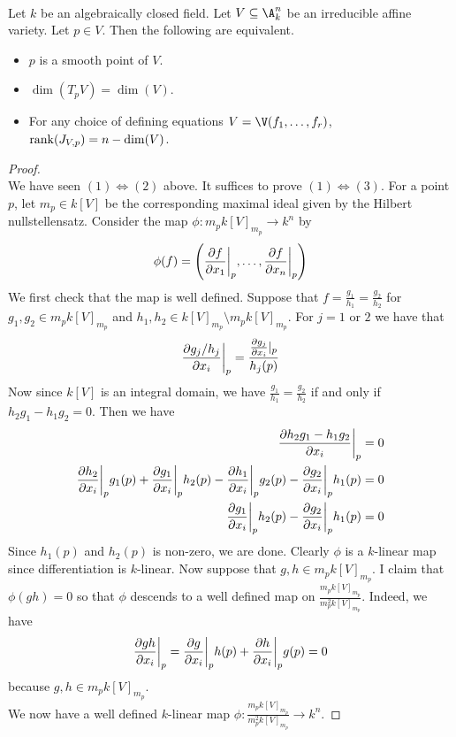 \documentclass[a4paper]{article}
\begin{document}
\begin{prp}{}{}\\
Let $k$ be an algebraically closed field. Let $V\subseteq\A_k^n$ be an irreducible affine variety. Let $p\in V$. Then the following are equivalent. 
\begin{itemize}
\item $p$ is a smooth point of $V$. 
\item $\dim(T_pV)=\dim(V)$. 
\item For any choice of defining equations $V=\V(f_1,\dots,f_r)$, $\rank(J_{V,p})=n-\dim(V)$. 
\end{itemize}
\begin{proof}\\
We have seen $(1)\iff(2)$ above. It suffices to prove $(1)\iff(3)$. For a point $p$, let $m_p\in k[V]$ be the corresponding maximal ideal given by the Hilbert nullstellensatz. Consider the map $\phi:m_pk[V]_{m_p}\to k^n$ by $$\phi(f)=\left(\frac{\partial f}{\partial x_1}\bigg{|}_p,\dots,\frac{\partial f}{\partial x_n}\bigg{|}_p\right)$$ We first check that the map is well defined. Suppose that $f=\frac{g_1}{h_1}=\frac{g_2}{h_2}$ for $g_1,g_2\in m_pk[V]_{m_p}$ and $h_1,h_2\in k[V]_{m_p}\setminus m_pk[V]_{m_p}$. For $j=1$ or $2$ we have that $$\frac{\partial g_j/h_j}{\partial x_i}\bigg{|}_p=\frac{\frac{\partial g_j}{\partial x_i}|_p}{h_j(p)}$$ Now since $k[V]$ is an integral domain, we have $\frac{g_1}{h_1}=\frac{g_2}{h_2}$ if and only if $h_2g_1-h_1g_2=0$. Then we have 
\begin{align*}
\frac{\partial h_2g_1-h_1g_2}{\partial x_i}\bigg{|}_p&=0\\
\frac{\partial h_2}{\partial x_i}\bigg{|}_pg_1(p)+\frac{\partial g_1}{\partial x_i}\bigg{|}_ph_2(p)-\frac{\partial h_1}{\partial x_i}\bigg{|}_pg_2(p)-\frac{\partial g_2}{\partial x_i}\bigg{|}_ph_1(p)&=0\\
\frac{\partial g_1}{\partial x_i}\bigg{|}_ph_2(p)-\frac{\partial g_2}{\partial x_i}\bigg{|}_ph_1(p)&=0
\end{align*}
Since $h_1(p)$ and $h_2(p)$ is non-zero, we are done. Clearly $\phi$ is a $k$-linear map since differentiation is $k$-linear. Now suppose that $g,h\in m_pk[V]_{m_p}$. I claim that $\phi(gh)=0$ so that $\phi$ descends to a well defined map on $\frac{m_pk[V]_{m_p}}{m_p^2k[V]_{m_p}}$. Indeed, we have $$\frac{\partial gh}{\partial x_i}\bigg{|}_p=\frac{\partial g}{\partial x_i}\bigg{|}_ph(p)+\frac{\partial h}{\partial x_i}\bigg{|}_pg(p)=0$$ because $g,h\in m_pk[V]_{m_p}$. \\

We now have a well defined $k$-linear map $\phi:\frac{m_pk[V]_{m_p}}{m_p^2k[V]_{m_p}}\to k^n$. 
\end{proof}
\end{prp}
\end{document}
